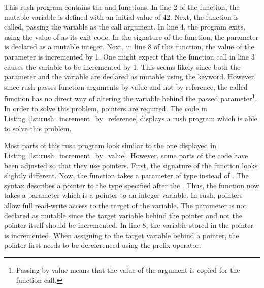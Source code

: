 
This rush program contains the  and  functions.
In line 2 of the  function, the mutable variable  is defined with an initial value of 42.
Next, the  function is called, passing the variable as the call argument.
In line 4, the program exits, using the value of  as its exit code.
In the signature of the  function, the  parameter is declared as a mutable integer.
Next, in line 8 of this function, the value of the parameter is incremented by 1.
One might expect that the function call in line 3 causes the variable  to be incremented by 1.
This seems likely since both the parameter and the variable are declared as mutable using the  keyword.
However, since rush passes function arguments by value and not by reference, the called function has no direct way of altering the variable behind the passed parameter\footnote{Passing by value means that the value of the argument is copied for the function call.}.
In order to solve this problem, pointers are required.
The code in Listing~\ref{lst:rush_increment_by_reference} displays a rush program which is able to solve this problem.


Most parts of this rush program look similar to the one displayed in Listing~\ref{lst:rush_increment_by_value}.
However, some parts of the code have been adjusted so that they use pointers.
First, the signature of the  function looks slightly different.
Now, the function takes a parameter of type  instead of .
The syntax  describes a pointer to the type specified after the \qVerb{*}.
Thus, the function now takes a parameter which is a pointer to an integer variable.
In rush, pointers allow full read-write access to the target of the variable.
The parameter is not declared as mutable since the target variable behind the pointer and not the pointer itself should be incremented.
In line 8, the variable stored in the pointer is incremented.
When assigning to the target variable behind a pointer, the pointer first needs to be dereferenced using the \qVerb{*} prefix operator.

